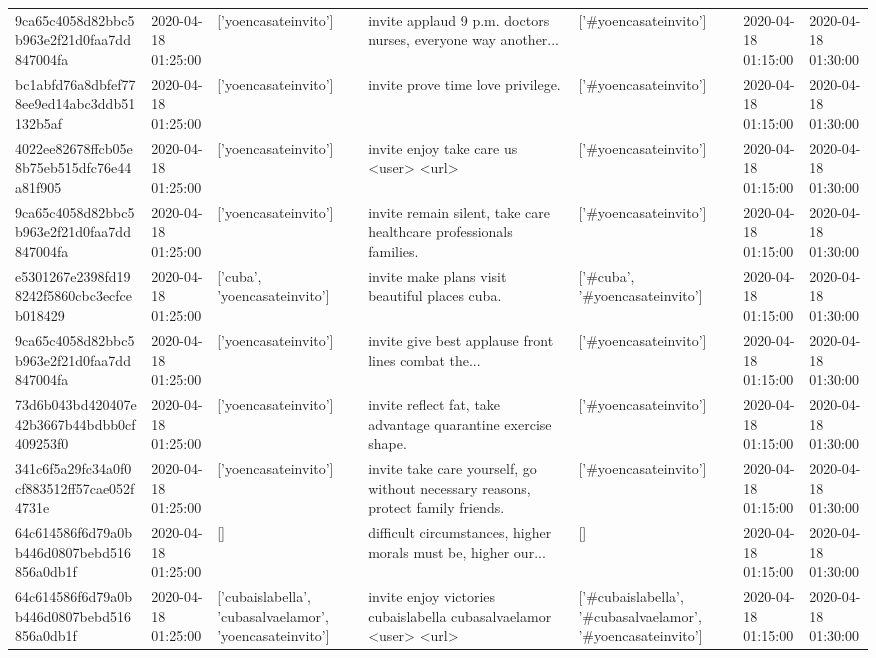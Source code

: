 \begin{tabular}{lllllll}
9ca65c4058d82bbc5b963e2f21d0faa7dd847004fa & 2020-04-18 01:25:00 & ['yoencasateinvito'] & invite applaud 9 p.m. doctors nurses, everyone way another... & ['#yoencasateinvito'] & 2020-04-18 01:15:00 & 2020-04-18 01:30:00 \\
bc1abfd76a8dbfef778ee9ed14abc3ddb51132b5af & 2020-04-18 01:25:00 & ['yoencasateinvito'] & invite prove time love privilege. & ['#yoencasateinvito'] & 2020-04-18 01:15:00 & 2020-04-18 01:30:00 \\
4022ee82678ffcb05e8b75eb515dfc76e44a81f905 & 2020-04-18 01:25:00 & ['yoencasateinvito'] & invite enjoy take care us 🌹 <user> <url> & ['#yoencasateinvito'] & 2020-04-18 01:15:00 & 2020-04-18 01:30:00 \\
9ca65c4058d82bbc5b963e2f21d0faa7dd847004fa & 2020-04-18 01:25:00 & ['yoencasateinvito'] & invite remain silent, take care healthcare professionals families. & ['#yoencasateinvito'] & 2020-04-18 01:15:00 & 2020-04-18 01:30:00 \\
e5301267e2398fd198242f5860cbc3ecfceb018429 & 2020-04-18 01:25:00 & ['cuba', 'yoencasateinvito'] & invite make plans visit beautiful places cuba. & ['#cuba', '#yoencasateinvito'] & 2020-04-18 01:15:00 & 2020-04-18 01:30:00 \\
9ca65c4058d82bbc5b963e2f21d0faa7dd847004fa & 2020-04-18 01:25:00 & ['yoencasateinvito'] & invite give best applause front lines combat the... & ['#yoencasateinvito'] & 2020-04-18 01:15:00 & 2020-04-18 01:30:00 \\
73d6b043bd420407e42b3667b44bdbb0cf409253f0 & 2020-04-18 01:25:00 & ['yoencasateinvito'] & invite reflect fat, take advantage quarantine exercise shape. & ['#yoencasateinvito'] & 2020-04-18 01:15:00 & 2020-04-18 01:30:00 \\
341c6f5a29fc34a0f0cf883512ff57cae052f4731e & 2020-04-18 01:25:00 & ['yoencasateinvito'] & invite take care yourself, go without necessary reasons, protect family friends. & ['#yoencasateinvito'] & 2020-04-18 01:15:00 & 2020-04-18 01:30:00 \\
64c614586f6d79a0bb446d0807bebd516856a0db1f & 2020-04-18 01:25:00 & [] & difficult circumstances, higher morals must be, higher our... & [] & 2020-04-18 01:15:00 & 2020-04-18 01:30:00 \\
64c614586f6d79a0bb446d0807bebd516856a0db1f & 2020-04-18 01:25:00 & ['cubaislabella', 'cubasalvaelamor', 'yoencasateinvito'] & invite enjoy victories cubaislabella cubasalvaelamor <user> <url> & ['#cubaislabella', '#cubasalvaelamor', '#yoencasateinvito'] & 2020-04-18 01:15:00 & 2020-04-18 01:30:00 \\

\end{tabular}
